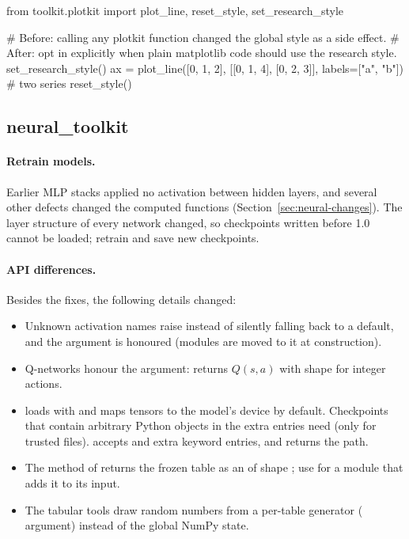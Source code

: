 \begin{pycode}
from toolkit.plotkit import plot_line, reset_style, set_research_style

# Before: calling any plotkit function changed the global style as a side effect.
# After: opt in explicitly when plain matplotlib code should use the research style.
set_research_style()
ax = plot_line([0, 1, 2], [[0, 1, 4], [0, 2, 3]], labels=["a", "b"])   # two series
reset_style()
\end{pycode}

\subsection{neural\_toolkit}\label{sec:migration-neural}

\paragraph{Retrain models.}
Earlier MLP stacks applied no activation between hidden layers, and several
other defects changed the computed functions (Section~\ref{sec:neural-changes}).
The layer structure of every network changed, so checkpoints written before
1.0 cannot be loaded; retrain and save new checkpoints.

\paragraph{API differences.} Besides the fixes, the following details changed:
\begin{itemize}
  \item Unknown activation names raise  instead of silently
    falling back to a default, and the  argument is honoured
    (modules are moved to it at construction).
  \item Q-networks honour the  argument:  returns
    $Q(s, a)$ with shape  for integer actions.
  \item {} loads with
     and maps tensors to the model's device by
    default. Checkpoints that contain arbitrary Python objects in the extra
    entries need  (only for trusted files).
     accepts  and extra keyword
    entries, and returns the path.
  \item The method  of 
    returns the frozen table as an  of shape
    ;
    use  for a module that adds it to its input.
  \item The tabular tools draw random numbers from a per-table generator
    ( argument) instead of the global NumPy state.
\end{itemize}

